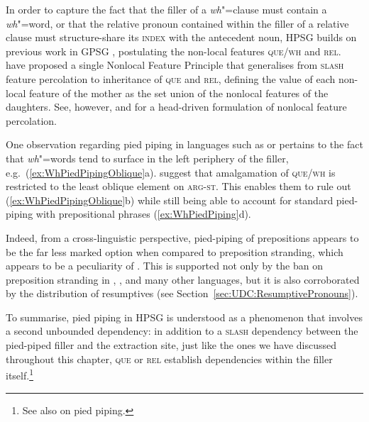 \documentclass[output=paper,biblatex,babelshorthands,newtxmath,draftmode,colorlinks,citecolor=brown]{langscibook}
\begin{document}
\noindent
In order to capture the fact that the filler of a \emph{wh}"=clause
must contain a \emph{wh}"=word, or that the relative pronoun contained
within the filler of a relative clause must structure-share its
\textsc{index} with the antecedent noun, HPSG builds on previous work
in GPSG \citep[Chapter~5.2]{Gazdar85}, postulating the non-local features
\textsc{que}/\textsc{wh} and \textsc{rel}. \citet[]{Pollard:Sag:94} have proposed
a single Nonlocal Feature Principle that generalises from
\textsc{slash} feature percolation to inheritance of \textsc{que} and
\textsc{rel}, defining the value of each non-local feature of the
mother as the set union of the nonlocal features of the
daughters. See, however, \citet[Section~4.2]{Sag:97} and
\citet[Chapter~7]{Ginzburg:Sag:01} for a head-driven formulation of nonlocal feature percolation.

One observation regarding pied piping in languages such as  or
 pertains to the fact that \emph{wh}"=words tend to surface in
the left periphery of the filler, e.g.~(\ref{ex:WhPiedPipingOblique}a). \citet[194,~fn.~26]{Ginzburg:Sag:01} suggest that
amalgamation of \textsc{que/wh} is restricted to the least oblique
element on \textsc{arg-st}. This enables them to rule out
(\ref{ex:WhPiedPipingOblique}b) while still being able to account for
standard pied-piping with prepositional phrases
(\ref{ex:WhPiedPiping}d).

\begin{exe}
  \ex \label{ex:WhPiedPipingOblique}
  \begin{xlist}
  \end{xlist}
\end{exe}

\largerpage
\noindent
Indeed, from a cross-linguistic perspective, pied-piping of
prepositions appears to be the far less marked option when compared to
preposition stranding, which appears to be a peculiarity of
 \citep[cf.][]{Riemsdijk78a}. This is supported not only by the ban on preposition
stranding in , , and many other languages, but it is also
corroborated by the distribution of resumptives (see Section~\ref{sec:UDC:ResumptivePronouns}).

To summarise, pied piping in HPSG is understood as a phenomenon that
involves a second unbounded dependency: in addition to a
\textsc{slash} dependency between the pied-piped filler and the
extraction site, just like the ones we have discussed throughout this
chapter, \textsc{que} or \textsc{rel} establish dependencies within
the filler itself.\footnote{
See also  on pied
  piping.
}
\end{document}
